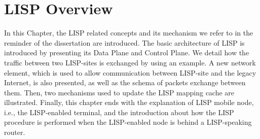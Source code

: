 
\chapter{LISP Overview}
\label{cha:lisp_overview}

\ifpdf
    \graphicspath{{Chapter2/Pics/Raster/}{Chapter2/Pics/PDF/}{Chapter2/}}
\else
    \graphicspath{{Chapter2/Pics/Vector/}{Chapter2/}}
\fi

In this Chapter, the LISP related concepts and its mechanism we refer to in the reminder of the dissertation are introduced. The basic architecture of LISP is introduced by presenting its Data Plane and Control Plane. We detail how the traffic between two LISP-sites is exchanged by using an example.
A new network element, which is used to allow communication between LISP-site and the legacy Internet, is also presented, as well as the schema of packets exchange between them. Then, two mechanisms used to update the LISP mapping cache are illustrated. Finally, this chapter ends with the explanation of LISP mobile node, i.e., the LISP-enabled terminal, and the introduction about how the LISP procedure is performed when the LISP-enabled node is behind a LISP-speaking router.





